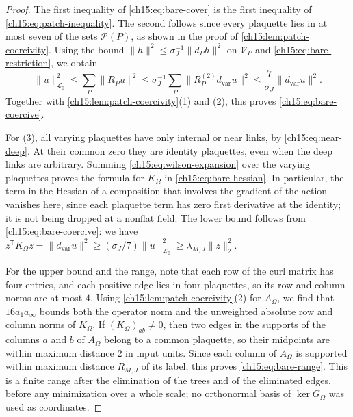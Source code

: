 \begin{proof}
The first inequality of \eqref{ch15:eq:bare-cover} is the first inequality of \eqref{ch15:eq:patch-inequality}. The second follows since every plaquette lies in at most seven of the sets $\mathcal P(P)$, as shown in the proof of \cref{ch15:lem:patch-coercivity}. Using the bound $\|h\|^2\le\sigma_J^{-1}\|d_Ph\|^2$ on $\mathcal V_P$ and \eqref{ch15:eq:bare-restriction}, we obtain
\[
 \|u\|_{\mathcal L_0}^2\le\sum_P\|R_Pu\|^2
 \le\sigma_J^{-1}\sum_P
                      \|R_P^{(2)}d_{\mathrm{var}}u\|^2
 \le\frac7{\sigma_J}\|d_{\mathrm{var}}u\|^2 .
\]
Together with \cref{ch15:lem:patch-coercivity}(1) and (2), this proves \eqref{ch15:eq:bare-coercive}.

For (3), all varying plaquettes have only internal or near links, by \eqref{ch15:eq:near-deep}. At their common zero they are identity plaquettes, even when the deep links are arbitrary. Summing \eqref{ch15:eq:wilson-expansion} over the varying plaquettes proves the formula for $K_\Omega$ in \eqref{ch15:eq:bare-hessian}. In particular, the term in the Hessian of a composition that involves the gradient of the action vanishes here, since each plaquette term has zero first derivative at the identity; it is not being dropped at a nonflat field. The lower bound follows from \eqref{ch15:eq:bare-coercive}: we have $z^{\mathsf T}K_\Omega z=\|d_{\mathrm{var}}u\|^2\ge(\sigma_J/7)\|u\|_{\mathcal L_0}^2\ge\lambda_{M,J}\|z\|_2^2$.

For the upper bound and the range, note that each row of the curl matrix has four entries, and each positive edge lies in four plaquettes, so its row and column norms are at most $4$. Using \cref{ch15:lem:patch-coercivity}(2) for $A_\Omega$, we find that $16a_1a_\infty$ bounds both the operator norm and the unweighted absolute row and column norms of $K_\Omega$. If $(K_\Omega)_{ab}\ne0$, then two edges in the supports of the columns $a$ and $b$ of $A_\Omega$ belong to a common plaquette, so their midpoints are within maximum distance $2$ in input units. Since each column of $A_\Omega$ is supported within maximum distance $R_{M,J}$ of its label, this proves \eqref{ch15:eq:bare-range}. This is a finite range after the elimination of the trees and of the eliminated edges, before any minimization over a whole scale; no orthonormal basis of $\ker G_\Omega$ was used as coordinates.


\end{proof}
